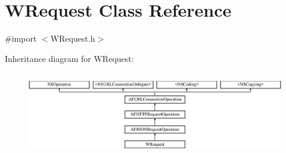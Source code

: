 \hypertarget{interface_w_request}{\section{W\-Request Class Reference}
\label{interface_w_request}
}


{\ttfamily \#import $<$W\-Request.\-h$>$}

Inheritance diagram for W\-Request\-:\begin{figure}[H]
\begin{center}
\leavevmode
\includegraphics[height=3.723404cm]{interface_w_request}
\end{center}
\end{figure}
